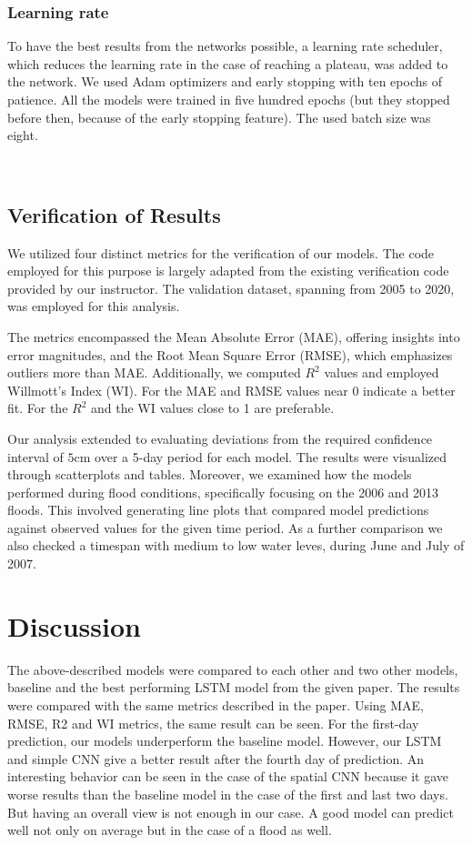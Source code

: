 \documentclass{article}
\begin{document}
\subsubsection{Learning rate}

To have the best results from the networks possible, a learning rate
scheduler, which reduces the learning rate in the case of reaching a plateau,
was added to the network. We used Adam optimizers and early stopping with ten
epochs of patience. All the models were trained in five hundred epochs (but
they stopped before then, because of the early stopping feature). The used
batch size was eight.

\

\subsection{Verification of Results}

We utilized four distinct metrics for the verification of our models. The code
employed for this purpose is largely adapted from the existing verification
code provided by our instructor. The validation dataset, spanning from 2005 to
2020, was employed for this analysis.

The metrics encompassed the Mean Absolute Error (MAE), offering insights into
error magnitudes, and the Root Mean Square Error (RMSE), which emphasizes
outliers more than MAE. Additionally, we computed $R^2$ values and employed
Willmott's Index (WI). For the MAE and RMSE values near 0 indicate a better
fit. For the $R^2$ and the WI values close to 1 are preferable.

Our analysis extended to evaluating deviations from the required confidence
interval of $5 \text{cm}$ over a 5-day period for each model. The results were
visualized through scatterplots and tables. Moreover, we examined how the
models performed during flood conditions, specifically focusing on the 2006
and 2013 floods. This involved generating line plots that compared model
predictions against observed values for the given time period. As a further
comparison we also checked a timespan with medium to low water leves, during
June and July of 2007.

\section{Discussion}

The above-described models were compared to each other and two other models,
baseline and the best performing LSTM model from the given
paper{\cite{WaterLevel2023}}. The results were compared with the same metrics
described in the paper. Using MAE, RMSE, R2 and WI metrics, the same result
can be seen. For the first-day prediction, our models underperform the
baseline model. However, our LSTM and simple CNN give a better result after
the fourth day of prediction. An interesting behavior can be seen in the case
of the spatial CNN because it gave worse results than the baseline model in
the case of the first and last two days. But having an overall view is not
enough in our case. A good model can predict well not only on average but in
the case of a flood as well.
\end{document}
